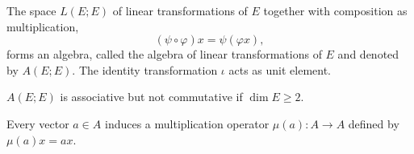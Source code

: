 The space $L(E; E)$ of linear transformations of $E$ together with composition as multiplication,
$$(\psi \circ \varphi)x = \psi(\varphi x),$$
forms an algebra, called the algebra of linear transformations of $E$ and denoted by $A(E; E)$. The identity transformation $\iota$ acts as unit element.

$A(E; E)$ is associative but not commutative if $\dim E \geq 2$.

Every vector $a \in A$ induces a multiplication operator $\mu(a): A \to A$ defined by $\mu(a)x = ax$.
